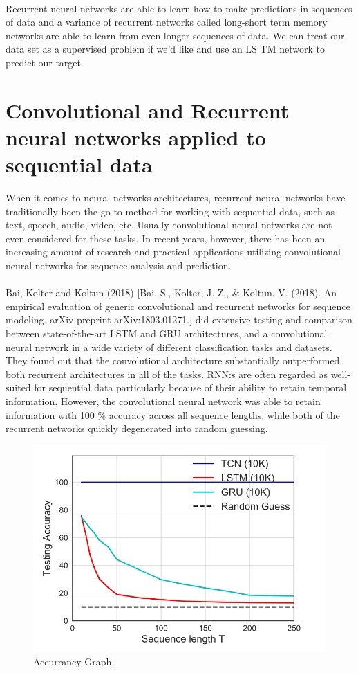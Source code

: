 \documentclass{article}
\begin{document}
    \paragraph{} 
    Recurrent neural networks are able to learn how to make predictions in sequences of data and a variance of recurrent networks called long-short term memory networks are able to learn from even longer sequences of data. We can treat our data set as a supervised problem if we'd like and use an LS TM network to predict our target.

\vspace{30mm}
\section{Convolutional and Recurrent neural networks applied to sequential data}
When it comes to neural networks architectures, recurrent neural networks have traditionally been the go-to method for working with sequential data, such as text, speech, audio, video, etc. Usually convolutional neural networks are not even considered for these tasks. In recent years, however, there has been an increasing amount of research and practical applications utilizing convolutional neural networks for sequence analysis and prediction.
  \paragraph{}
  Bai, Kolter and Koltun (2018) [Bai, S., Kolter, J. Z., \& Koltun, V. (2018). An empirical evaluation of generic convolutional and recurrent networks for sequence modeling. arXiv preprint arXiv:1803.01271.] did extensive testing and comparison between state-of-the-art LSTM and GRU architectures, and a convolutional neural network in a wide variety of different classification tasks and datasets. They found out that the convolutional architecture substantially outperformed both recurrent architectures in all of the tasks. RNN:s are often regarded as well-suited for sequential data particularly because of their ability to retain temporal information. However, the convolutional neural network was able to retain information with 100 \% accuracy across all sequence lengths, while both of the recurrent networks quickly degenerated into random guessing.
  \begin{figure}[h!]
    \begin{center}
      \includegraphics[width=0.8\linewidth]{img/image5.png}
      \caption{Accurrancy Graph.}
      \label{fig:snn}
    \end{center}
  \end{figure}
\end{document}
